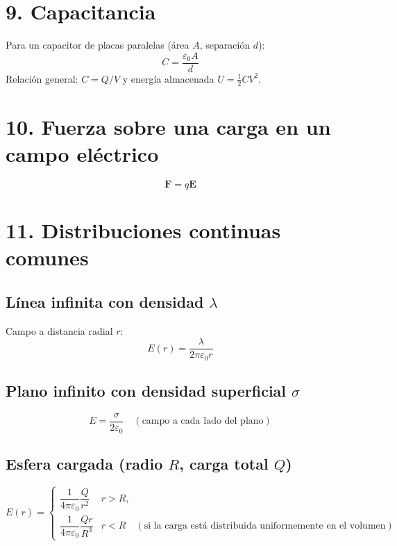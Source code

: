 \section*{9. Capacitancia}
Para un capacitor de placas paralelas (área $A$, separación $d$):
\begin{equation}
C=\dfrac{\varepsilon_0 A}{d}
\end{equation}
Relaci\'on general: $C=Q/V$ y energ\'ia almacenada $U=\tfrac{1}{2}CV^2$.


\section*{10. Fuerza sobre una carga en un campo eléctrico}
\begin{equation}
\mathbf{F}=q\mathbf{E}
\end{equation}


\section*{11. Distribuciones continuas comunes}
\subsection*{Línea infinita con densidad $\lambda$}
Campo a distancia radial $r$:
\begin{equation}
E(r)=\dfrac{\lambda}{2\pi\varepsilon_0 r}
\end{equation}


\subsection*{Plano infinito con densidad superficial $\sigma$}
\begin{equation}
E=\dfrac{\sigma}{2\varepsilon_0} \quad(\text{campo a cada lado del plano})
\end{equation}


\subsection*{Esfera cargada (radio $R$, carga total $Q$)}
\begin{equation}
E(r)=\begin{cases}
\dfrac{1}{4\pi\varepsilon_0}\dfrac{Q}{r^{2}} & r>R,\\[6pt]
\dfrac{1}{4\pi\varepsilon_0}\dfrac{Q r}{R^{3}} & r<R \quad(\text{si la carga est\'a distribuida uniformemente en el volumen})
\end{cases}
\end{equation}


